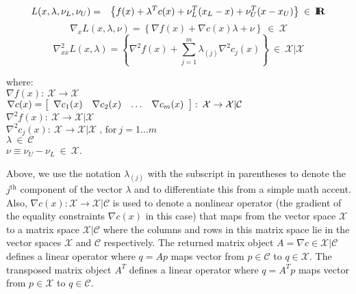 \documentclass[pdf,ps2pdf,11pt]{SANDreport}
\begin{document}
{\bsinglespace
\begin{eqnarray}
L(x,\lambda,\nu_L,\nu_U)
 & = & \left\{ f(x) + \lambda^T c(x) + \nu_L^T ( x_L - x ) + \nu_U^T ( x - x_U ) \right\} \:\in\:\RE
\label{moocho:eqn:L_def}
\end{eqnarray}
%
\begin{equation}
\nabla_{x} L(x,\lambda,\nu) = \left\{ \nabla f(x) + \nabla c(x) \lambda + \nu
   \right\} \:\in\:\mathcal{X}
\label{moocho:eqn:GL_def}
\end{equation}
%
\begin{equation}
\nabla_{xx}^2 L(x,\lambda) = \left\{ \nabla^2 f(x) + \sum^m_{j=1} \lambda_{(j)} \nabla^2 c_j(x) \right\}
	\:\in\: \mathcal{X}|\mathcal{X} \label{moocho:eqn:HL_def}
\end{equation}
%
\begin{tabbing}
\hspace{4ex}where:\hspace{5ex}\= \\
\>	$\nabla f(x) : \:\mathcal{X} \rightarrow \mathcal{X}$ \\
\>	$\nabla c(x) = {\bmat{cccc} \nabla c_1 (x) & \nabla c_2 (x) & \ldots & \nabla c_m (x)  \emat}
         : \:\mathcal{X} \rightarrow \mathcal{X}|\mathcal{C}$ \\
\>	$\nabla^2 f(x) : \:\mathcal{X} \rightarrow \mathcal{X}|\mathcal{X}$ \\
\>	$\nabla^2 c_j(x) : \:\mathcal{X} \rightarrow \mathcal{X}|\mathcal{X} \; \mbox{, for}\:j = 1 \ldots m$ \\
\>	$\lambda \:\in\:\mathcal{C}$ \\
\>	$\nu \equiv \nu_U - \nu_L \:\in\:\mathcal{X}$.
\end{tabbing}

Above, we use the notation $\lambda_{(j)}$ with the subscript in
parentheses to denote the $j^{\mbox{th}}$ component of the vector
$\lambda$ and to differentiate this from a simple math accent.  Also,
$\nabla c(x) : \mathcal{X} \rightarrow \mathcal{X}|\mathcal{C}$ is
used to denote a nonlinear operator (the gradient of the equality
constraints $\nabla c(x)$ in this case) that maps from the vector
space $\mathcal{X}$ to a matrix space $\mathcal{X}|\mathcal{C}$ where
the columns and rows in this matrix space lie in the vector spaces
$\mathcal{X}$ and $\mathcal{C}$ respectively.  The returned matrix
object $A = \nabla c \in \mathcal{X}|\mathcal{C}$ defines a linear
operator where $q = A p$ maps vector from $p \in \mathcal{C}$ to $q
\in \mathcal{X}$.  The transposed matrix object $A^T$ defines a linear
operator where $q = A^T p$ maps vector from $p \in \mathcal{X}$ to $q
\in \mathcal{C}$.

}
\end{document}
